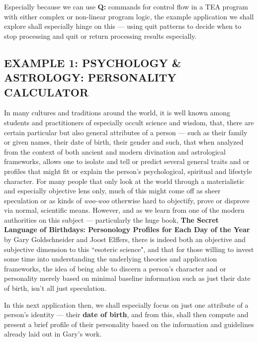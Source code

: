\documentclass[a4paper, 18pt]{book} %
\begin{document}
{{  
Especially because we can use \textbf{Q:} commands for control flow in a TEA program with either complex or non-linear program logic, the example application we shall explore shall especially hinge on this --- using quit patterns to decide when to stop processing and quit or return processing results especially.


\subsection{EXAMPLE 1: \textbf{PSYCHOLOGY \& ASTROLOGY:} PERSONALITY CALCULATOR  }
\label{SECEXAMP1Q}


In many cultures and traditions around the world, it is well known among students and practitioners of especially occult science and wisdom, that, there are certain particular but also general attributes of a person --- such as their family or given names, their date of birth, their gender and such, that when analyzed from the context of both ancient and modern divination and astrological frameworks, allows one to isolate and tell or predict several general traits and or profiles that might fit or explain the person's psychological, spiritual and lifestyle character. For many people that only look at the world through a materialistic and especially objective lens only, much of this might come off as sheer speculation or as kinds of \textit{woo-woo} otherwise hard to objectify, prove or disprove via normal, scientific means. However, and as we learn from one of the modern authorities on this subject --- particularly the huge book, \textbf{The Secret Language of Birthdays: Personology Profiles for Each Day of the Year}\cite{goldschneider1994secret} by Gary Goldschneider and Joost Elffers, there is indeed both an objective and subjective dimension to this ``esoteric science", and that for those willing to invest some time into understanding the underlying theories and application frameworks, the idea of being able to discern a person's character and or personality merely based on minimal baseline information such as just their date of birth, isn't all just speculation.

\vspace{2em}

In this next application then, we shall especially focus on just one attribute of a person's identity --- their \textbf{date of birth}, and from this, shall then compute and present a brief profile of their personality based on the information and guidelines already laid out in Gary's work\cite{goldschneider1994secret}.

}}
\end{document}
